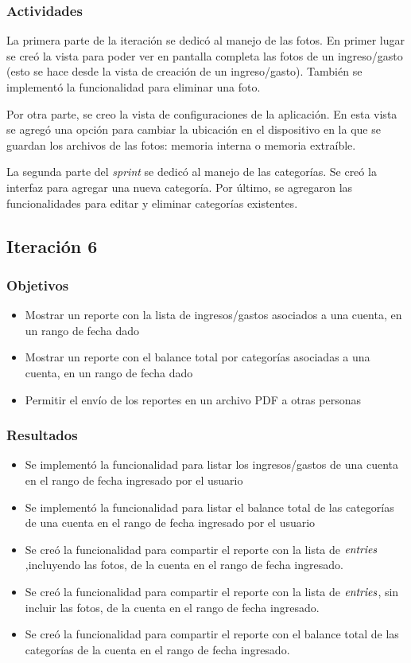 \subsubsection{Actividades}
La primera parte de la iteración se dedicó al manejo de las fotos. En primer lugar se creó la vista para poder ver en pantalla completa las fotos de un ingreso/gasto (esto se hace desde la vista de creación de un ingreso/gasto). También se implementó la funcionalidad para eliminar una foto.

Por otra parte, se creo la vista de configuraciones de la aplicación. En esta vista se agregó una opción para cambiar la ubicación en el dispositivo en la que se guardan los archivos de las fotos: memoria interna o memoria extraíble.

La segunda parte del \textit{sprint} se dedicó al manejo de las categorías. Se creó la interfaz para agregar una nueva categoría. Por último, se agregaron las funcionalidades para editar y eliminar categorías existentes.


\subsection{Iteración 6}
\subsubsection{Objetivos}
\begin{itemize}
\item Mostrar un reporte con la lista de ingresos/gastos asociados a una cuenta, en un rango de fecha dado
\item Mostrar un reporte con el balance total por categorías asociadas a una cuenta, en un rango de fecha dado
\item Permitir el envío de los reportes en un archivo PDF a otras personas

\end{itemize}

\subsubsection{Resultados}
\begin{itemize}
\item Se implementó la funcionalidad para listar los ingresos/gastos de una cuenta en el rango de fecha ingresado por el usuario
\item Se implementó la funcionalidad para listar el balance total de las categorías de una cuenta en el rango de fecha ingresado por el usuario
\item Se creó la funcionalidad para compartir el reporte con la lista de $\textit{entries}$,incluyendo las fotos, de la cuenta en el rango de fecha ingresado.
\item Se creó la funcionalidad para compartir el reporte con la lista de $\textit{entries}$, sin incluir las fotos, de la cuenta en el rango de fecha ingresado.
\item Se creó la funcionalidad para compartir el reporte con el balance total de las categorías de la cuenta en el rango de fecha ingresado.
\end{itemize}

